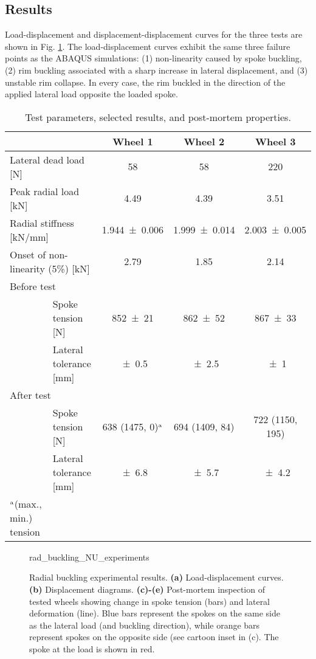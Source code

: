 \documentclass[\rootdir/thesis.tex]{subfiles}
\begin{document}
\subsection{Results}

Load-displacement and displacement-displacement curves for the three tests are shown in Fig. \ref{fig:rad_buckling_NU_experiments}. The load-displacement curves exhibit the same three failure points as the ABAQUS simulations: (1) non-linearity caused by spoke buckling, (2) rim buckling associated with a sharp increase in lateral displacement, and (3) unstable rim collapse. In every case, the rim buckled in the direction of the applied lateral load opposite the loaded spoke.

\begin{table}
\caption{Test parameters, selected results, and post-mortem properties.}
\label{tab:rad_buckling_tests}
\begin{tabular}{llccc}
\hline
&& \bf Wheel 1 & \bf Wheel 2 & \bf Wheel 3\\
\hline
\multicolumn{2}{l}{Lateral dead load [\si{N}]} & \num{58} & \num{58} & \num{220}\\
\multicolumn{2}{l}{Peak radial load [\si{kN}]} & \num{4.49} & \num{4.39} & \num{3.51}\\
\multicolumn{2}{l}{Radial stiffness [\si{kN/mm}]} & \num{1.944+-0.006} & \num{1.999+-0.014} & \num{2.003+-0.005}\\
\multicolumn{2}{l}{Onset of non-linearity (5\%) [\si{kN}]} & \num{2.79} & \num{1.85} & \num{2.14}\\
\multicolumn{5}{l}{Before test}\\
\,& Spoke tension [\si{N}]      & \num{852+-21} & \num{862+-52} & \num{867+-33}\\
\,& Lateral tolerance [\si{mm}] & \num{+-0.5} & \num{+-2.5} & \num{+-1}\\

\multicolumn{5}{l}{After test}\\
\,& Spoke tension [\si{N}]      & 638 (1475, 0)$^{\rm a}$ & 694 (1409, 84) & 722 (1150, 195)\\
\,& Lateral tolerance [\si{mm}] & \num{+-6.8} & \num{+-5.7} & \num{+-4.2}\\
\hline
$^{\rm a}$(max., min.) tension\\
\hline
\end{tabular}
\end{table}

\begin{figure}
\centering
{rad_buckling_NU_experiments}
\caption{Radial buckling experimental results. \textbf{(a)} Load-displacement curves. \textbf{(b)} Displacement diagrams. \textbf{(c)-(e)} Post-mortem inspection of tested wheels showing change in spoke tension (bars) and lateral deformation (line). Blue bars represent the spokes on the same side as the lateral load (and buckling direction), while orange bars represent spokes on the opposite side (see cartoon inset in (c). The spoke at the load is shown in red.}
\label{fig:rad_buckling_NU_experiments}
\end{figure}
\end{document}

